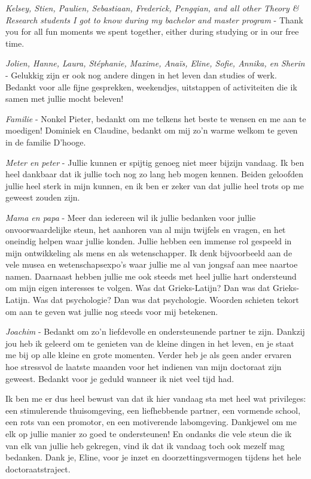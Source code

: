 \textit{Kelsey, Stien, Paulien, Sebastiaan, Frederick, Pengqian, and all other Theory \& Research students I got to know during my bachelor and master program} - Thank you for all fun moments we spent together, either during studying or in our free time. 

\textit{Jolien, Hanne, Laura, Stéphanie, Maxime, Anaïs, Eline, Sofie, Annika, en Sherin} - Gelukkig zijn er ook nog andere dingen in het leven dan studies of werk. Bedankt voor alle fijne gesprekken, weekendjes, uitstappen of activiteiten die ik samen met jullie mocht beleven! 

\textit{Familie} - Nonkel Pieter, bedankt om me telkens het beste te wensen en me aan te moedigen! Dominiek en Claudine, bedankt om mij zo'n warme welkom te geven in de familie D'hooge. 

\textit{Meter en peter} - Jullie kunnen er spijtig genoeg niet meer bijzijn vandaag. Ik ben heel dankbaar dat ik jullie toch nog zo lang heb mogen kennen. Beiden geloofden jullie heel sterk in mijn kunnen, en ik ben er zeker van dat jullie heel trots op me geweest zouden zijn.

\textit{Mama en papa} - Meer dan iedereen wil ik jullie bedanken voor jullie onvoorwaardelijke steun, het aanhoren van al mijn twijfels en vragen, en het oneindig helpen waar jullie konden. Jullie hebben een immense rol gespeeld in mijn ontwikkeling als mens en als wetenschapper. Ik denk bijvoorbeeld aan de vele musea en wetenschapsexpo's waar jullie me al van jongsaf aan mee naartoe namen. Daarnaast hebben jullie me ook steeds met heel jullie hart ondersteund om mijn eigen interesses te volgen. Was dat Grieks-Latijn? Dan was dat Grieks-Latijn. Was dat psychologie? Dan was dat psychologie. Woorden schieten tekort om aan te geven wat jullie nog steeds voor mij betekenen.

\textit{Joachim} - Bedankt om zo'n liefdevolle en ondersteunende partner te zijn. Dankzij jou heb ik geleerd om te genieten van de kleine dingen in het leven, en je staat me bij op alle kleine en grote momenten. Verder heb je als geen ander ervaren hoe stressvol de laatste maanden voor het indienen van mijn doctoraat zijn geweest. Bedankt voor je geduld wanneer ik niet veel tijd had. 

Ik ben me er dus heel bewust van dat ik hier vandaag sta met heel wat privileges: een stimulerende thuisomgeving, een liefhebbende partner, een vormende school, een rots van een promotor, en een motiverende labomgeving. Dankjewel om me elk op jullie manier zo goed te ondersteunen! En ondanks die vele steun die ik van elk van jullie heb gekregen, vind ik dat ik vandaag toch ook mezelf mag bedanken. Dank je, Eline, voor je inzet en doorzettingsvermogen tijdens het hele doctoraatstraject.

\mbox{}
\newpage \thispagestyle{empty}

\mbox{}
\clearpage \thispagestyle{empty}

\clearpage \thispagestyle{empty}